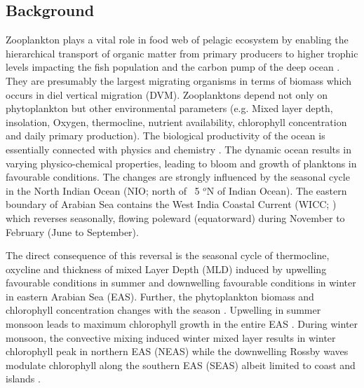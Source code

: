 \documentclass{article}
\begin{document}
	\subsection{Background}
	Zooplankton plays a vital role in food web of pelagic ecosystem by enabling the hierarchical transport of organic matter from primary producers to higher trophic levels impacting the fish population and the carbon pump of the deep ocean \citep{ohman2001density, le2016global}. They are presumably the largest migrating organisms in terms of biomass \citep{hays2003review} which occurs in diel vertical migration (DVM). Zooplanktons depend not only on phytoplankton but other environmental parameters (e.g. Mixed layer depth, insolation, Oxygen, thermocline, nutrient availability, chlorophyll concentration and daily primary production). The biological productivity of the ocean is essentially connected with physics and chemistry \citep{subrahmanyan1959studiespart2, ryther1966primary, qasim1977biological, nair1970primary,banse1995zooplankton,mccreary2009biophysical, vijith2016consequences,amol2020modulation}. The dynamic ocean results in varying physico-chemical properties, leading to bloom and growth of planktons in favourable conditions. The changes are strongly influenced by the seasonal cycle in the North Indian Ocean (NIO; north of ~5 $^o$N of Indian Ocean). The eastern boundary of Arabian Sea contains the West India Coastal Current (WICC; \citep{patil1964hydrography, ramamirtham1965hydrography, banse1968hydrography,shetye1991coastal, mccreary1993numerical, shankar1997dynamics, shetye1998coastal, maheswaran2000upwelling, schott20011,  amol2014observed, chaudhuri2020observed,chaudhuri2021observed}) which reverses seasonally, flowing poleward (equatorward) during November to February (June to September). 
	
	The direct consequence of this reversal is the seasonal cycle of thermocline, oxycline and thickness of mixed Layer Depth (MLD) induced by upwelling favourable conditions in summer and downwelling favourable conditions in winter in eastern Arabian Sea (EAS). Further, the phytoplankton biomass and chlorophyll concentration changes with the season \citep{subrahmanyan1960studies, banse1968hydrography, levy2007basin, vijith2016consequences}. Upwelling in  summer monsoon leads to maximum chlorophyll growth in the entire EAS \citep{ banse1968hydrography, banse2000geographical, mccreary2009biophysical, hood2017biogeochemical,shi2022phytoplankton}. During winter monsoon, the convective mixing induced winter mixed layer \citep{shetye1992does, madhupratap1996mechanism, levy2007basin, vijith2016consequences, shankar2016inhibition, keerthi2017physical,shi2022phytoplankton} results in winter chlorophyll peak in northern EAS (NEAS) while the downwelling Rossby waves modulate chlorophyll along the southern EAS (SEAS) albeit limited to coast and islands \citep{amol2020modulation}. 
	
\end{document}
